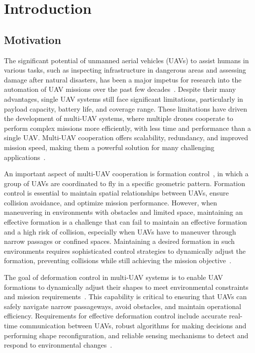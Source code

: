 \chapter{Introduction}\label{chap1}

\section{Motivation}\label{sec11}
The significant potential of unmanned aerial vehicles (UAVs) to assist humans in various tasks, such as inspecting infrastructure in dangerous areas and assessing damage after natural disasters, has been a major impetus for research into the automation of UAV missions over the past few decades~\cite{9306908}. Despite their many advantages, single UAV systems still face significant limitations, particularly in payload capacity, battery life, and coverage range. These limitations have driven the development of multi-UAV systems, where multiple drones cooperate to perform complex missions more efficiently, with less time and performance than a single UAV. Multi-UAV cooperation offers scalability, redundancy, and improved mission speed, making them a powerful solution for many challenging applications~\cite{Skorobogatov2020,Tang2022}.

An important aspect of multi-UAV cooperation is formation control~\cite{Oh2015}, in which a group of UAVs are coordinated to fly in a specific geometric pattern. Formation control is essential to maintain spatial relationships between UAVs, ensure collision avoidance, and optimize mission performance. However, when maneuvering in environments with obstacles and limited space, maintaining an effective formation is a challenge that can fail to maintain an effective formation and a high risk of collision, especially when UAVs have to maneuver through narrow passages or confined spaces. Maintaining a desired formation in such environments requires sophisticated control strategies to dynamically adjust the formation, preventing collisions while still achieving the mission objective~\cite{Huang2019,Rastgoftar2019}.

The goal of deformation control in multi-UAV systems is to enable UAV formations to dynamically adjust their shapes to meet environmental constraints and mission requirements~\cite{Oh2015,Huang2019}. This capability is critical to ensuring that UAVs can safely navigate narrow passageways, avoid obstacles, and maintain operational efficiency. Requirements for effective deformation control include accurate real-time communication between UAVs, robust algorithms for making decisions and performing shape reconfiguration, and reliable sensing mechanisms to detect and respond to environmental changes~\cite{736776,Berlinger2021,9565893,Elkilany2020,AlonsoMora2018,Vsrhelyi2018,7828016,Wu2020}.

